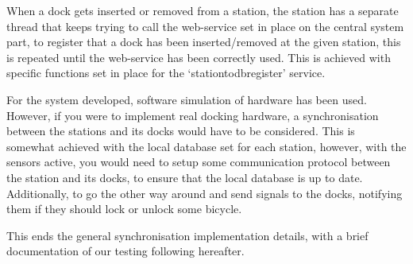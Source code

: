 \begin{description}[style=nextline]
	\item[Dock insertion/removal]
	When a dock gets inserted or removed from a station, the station has a separate thread that keeps trying to call the web-service set in place on the central system part, to register that a dock has been inserted/removed at the given station, this is repeated until the web-service has been correctly used.
	This is achieved with specific functions set in place for the `stationtodbregister' service.
	
	\item[Hardware versus software simulation]
	For the system developed, software simulation of hardware has been used.
	However, if you were to implement real docking hardware, a synchronisation between the stations and its docks would have to be considered.
	This is somewhat achieved with the local database set for each station, however, with the sensors active, you would need to setup some communication protocol between the station and its docks, to ensure that the local database is up to date.
	Additionally, to go the other way around and send signals to the docks, notifying them if they should lock or unlock some bicycle.
	
\end{description}

This ends the general synchronisation implementation details, with a brief documentation of our testing following hereafter.